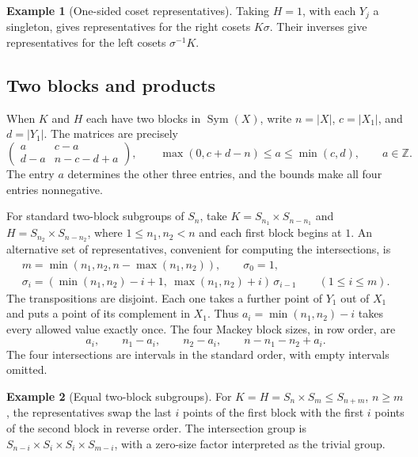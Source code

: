 \documentclass[11pt,a4paper]{article}
\numberwithin{equation}{section}
\theoremstyle{definition}
\newtheorem{example}{Example}[section]
\begin{document}
\begin{example}[One-sided coset representatives]\label{ex:tableau-one-sided}
Taking \(H=1\), with each \(Y_j\) a singleton, gives representatives
for the right cosets \(K\sigma\). Their inverses give representatives
for the left cosets \(\sigma^{-1}K\).
\end{example}

\subsection{Two blocks and products}\label{sec:parabolic-binary-cosets}

When \(K\) and \(H\) each have two blocks in \(\operatorname{Sym}(X)\),
write \(n=|X|\), \(c=|X_1|\), and \(d=|Y_1|\). The matrices are precisely
\[
 \begin{pmatrix}
 a&c-a\\ d-a&n-c-d+a
 \end{pmatrix},
 \qquad \max(0,c+d-n)\le a\le\min(c,d),\qquad a\in\mathbb Z.
\]
The entry \(a\) determines the other three entries, and the bounds
make all four entries nonnegative.

For standard two-block subgroups of \(S_n\), take
\(K=S_{n_1}\times S_{n-n_1}\) and \(H=S_{n_2}\times S_{n-n_2}\),
where \(1\le n_1,n_2<n\) and each first block begins at \(1\).
An alternative
set of representatives, convenient for computing the intersections,
is
\[
 \begin{gathered}
 m=\min(n_1,n_2,n-\max(n_1,n_2)),\qquad \sigma_0=1,\\
 \sigma_i=(\min(n_1,n_2)-i+1,\ \max(n_1,n_2)+i)\,\sigma_{i-1}
     \qquad (1\le i\le m).
 \end{gathered}
\]
The transpositions are disjoint. Each one takes a further point
of \(Y_1\) out of \(X_1\) and puts a point of its complement in
\(X_1\). Thus \(a_i=\min(n_1,n_2)-i\) takes every allowed value
exactly once. The four Mackey block sizes, in row order, are
\[
 a_i,\qquad n_1-a_i,\qquad n_2-a_i,\qquad n-n_1-n_2+a_i.
\]
The four intersections are intervals in the standard order, with
empty intervals omitted.

\begin{example}[Equal two-block subgroups]\label{ex:equal-two-blocks}
For
\(K=H=S_n\times S_m\le S_{n+m}\), \(n\ge m\), the representatives
swap the last \(i\) points of the first block with the first
\(i\) points of the second block in reverse order. The intersection
group is \(S_{n-i}\times S_i\times S_i\times S_{m-i}\),
with a zero-size factor interpreted as the trivial group.
\end{example}
\end{document}
